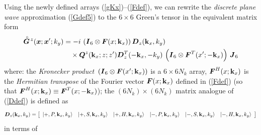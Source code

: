 \documentclass[11pt,a4paper]{article}
\newcommand{\bmi}[1]{\mbox{\boldmath$\mit #1$\unboldmath}}
\newcommand{\rf}[1]{\stackrel{\scriptscriptstyle _{\,\,\circ}}{ #1}}
\begin{document}
Using the newly defined arrays (\ref{gKx})--(\ref{Fdef}),
we can  rewrite the {\em discrete plane wave\/}
approximation (\ref{Gdef5}) to the $6 \times 6$ Green's tensor in the equivalent matrix
form
\begin{align} \label{superG}
\rf{\bmi G}\!{}^{z}({\bmi x};{\bmi x}^{\prime};k_y)
&=- i\,\left({\bmi I}_6\otimes
{\bmi F}(x;{\bf k}_{x})  \right) {\bmi  D}_{z}({\bf k}_{x},{k}_{y})\nonumber\\
&\quad\times
{\bmi Q}^{z}({\bf k}_{x};z;z^{\prime}){\bmi  D}_{z}^{T}(-{\bf k}_{x},-{k}_{y})
\,\left({\bmi I}_6\otimes {\bmi F}^{T}(x^{\prime};-{\bf k}_{x})  \right)\,{\bmi  J}_6
\end{align}
where:\newline
the {\em Kronecker product\/}
$\,\left({\bmi I}_6\otimes {\bmi F}(x^{\prime};{\bf k}_{x})  \right)$ is
a $  6 \times 6 N_k$ array,
${\bmi F}^{H}(x;{\bf k}_{x})$ is the {\em Hermitian transpose\/} of the
Fourier vector ${\bmi F}(x;{\bf k}_{x})$ defined in (\ref{Fdef})
(so that ${\bmi F}^{H}(x;{\bf k}_{x})\equiv {\bmi F}^{T}(x;-{\bf
k}_{x})$);\newline
 the $(6N_k)\times (6N_k)$ matrix analogue of (\ref{Ddef}) is defined
as
\begin{equation} \label{Dsuperdef}
{\bmi D}_{z}({\bf k}_{x},k_{y})=\left[\begin{array}{cccccc}
\left|+,P, {\bf k}_{x},k_{y}  \right\rangle&\left|+,S, {\bf k}_{x},k_{y}
\right\rangle&\left|+,H, {\bf k}_{x},k_{y}  \right\rangle&
\left|-,P, {\bf k}_{x},k_{y}  \right\rangle&\left|-,S, {\bf k}_{x},k_{y}
\right\rangle&\left|-,H, {\bf k}_{x},k_{y}  \right\rangle
\end{array}\right]
\end{equation}
in terms of
\end{document}
